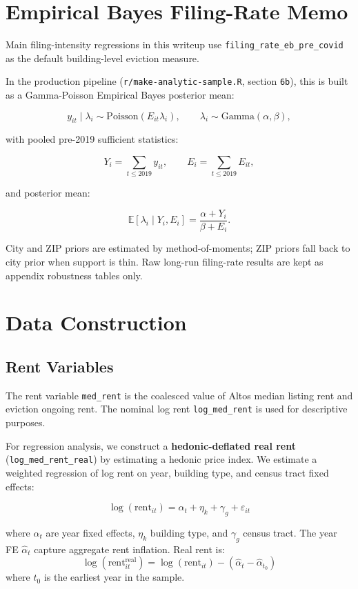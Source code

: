 \documentclass[
  11pt,
]{article}
\begin{document}
\section{Empirical Bayes Filing-Rate
Memo}\label{empirical-bayes-filing-rate-memo}

Main filing-intensity regressions in this writeup use
\texttt{filing\_rate\_eb\_pre\_covid} as the default building-level
eviction measure.

In the production pipeline (\texttt{r/make-analytic-sample.R}, section
\texttt{6b}), this is built as a Gamma-Poisson Empirical Bayes posterior
mean:

\[
y_{it} \mid \lambda_i \sim \text{Poisson}(E_{it}\lambda_i), \qquad
\lambda_i \sim \text{Gamma}(\alpha,\beta),
\]

with pooled pre-2019 sufficient statistics:

\[
Y_i = \sum_{t \le 2019} y_{it}, \qquad
E_i = \sum_{t \le 2019} E_{it},
\]

and posterior mean:

\[
\mathbb{E}[\lambda_i \mid Y_i, E_i] = \frac{\alpha + Y_i}{\beta + E_i}.
\]

City and ZIP priors are estimated by method-of-moments; ZIP priors fall
back to city prior when support is thin. Raw long-run filing-rate
results are kept as appendix robustness tables only.

\section{Data Construction}\label{data-construction}

\subsection{Rent Variables}\label{rent-variables}

The rent variable \texttt{med\_rent} is the coalesced value of Altos
median listing rent and eviction ongoing rent. The nominal log rent
\texttt{log\_med\_rent} is used for descriptive purposes.

For regression analysis, we construct a \textbf{hedonic-deflated real
rent} (\texttt{log\_med\_rent\_real}) by estimating a hedonic price
index. We estimate a weighted regression of log rent on year, building
type, and census tract fixed effects:

\[
\log(\text{rent}_{it}) = \alpha_t + \eta_k + \gamma_g + \varepsilon_{it}
\]

where \(\alpha_t\) are year fixed effects, \(\eta_k\) building type, and
\(\gamma_g\) census tract. The year FE \(\hat\alpha_t\) capture
aggregate rent inflation. Real rent is: \[
\log(\text{rent}^{\text{real}}_{it}) = \log(\text{rent}_{it}) - (\hat\alpha_t - \hat\alpha_{t_0})
\] where \(t_0\) is the earliest year in the sample.
\end{document}
